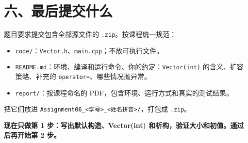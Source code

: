 \documentclass[11pt,a4paper]{article}
\newcommand{\code}[1]{\texttt{#1}}
\begin{document}
\section{六、最后提交什么}

题目要求提交包含全部源文件的 \code{.zip}。按课程统一规范：

\begin{itemize}
  \item \code{code/}：\code{Vector.h}、\code{main.cpp}；不放可执行文件。
  \item \code{README.md}：环境、编译和运行命令、你的约定：\code{Vector(int)} 的含义、扩容策略、补充的 \code{operator=}、哪些情况抛异常。
  \item \code{report/}：按课程命名的 PDF，包含环境、运行方式和真实的测试结果。
\end{itemize}

把它们放进 \code{Assignment06\_<学号>\_<姓名拼音>/}，打包成 \code{.zip}。

\bigskip
\begin{center}
\textbf{现在只做第 1 步：写出默认构造、Vector(int) 和析构，验证大小和初值。通过后再开始第 2 步。}
\end{center}
\end{document}
